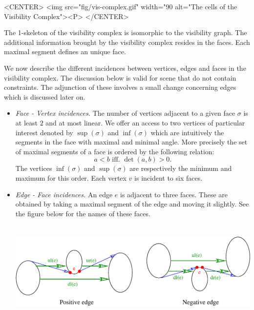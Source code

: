 \begin{ccHtmlOnly}
    <CENTER>
        <img src="fig/vis-complex.gif" width="90%
         alt="The cells of the Visibility Complex"><P>
    </CENTER>
\end{ccHtmlOnly}

The 1-skeleton of the visibility complex is isomorphic to the visibility graph.
The additional information brought by the visibility complex resides in the
faces. Each maximal segment defines an unique face.

We now describe the different incidences between vertices, edges and faces in
the visibility complex. The discussion below is valid for scene that do not
contain constraints. The adjunction of these involves a small change concerning
edges which is discussed later on.
\begin{itemize}
    \item \emph{Face - Vertex incidences. } The number of vertices adjacent to a
    given face $\sigma$ is at least $2$ and at most linear. We offer an access
    to two vertices of particular interest denoted by $\sup(\sigma)$ and 
    $\inf(\sigma)$ which are intuitively the segments in the face with maximal 
    and minimal angle. More precisely the set of maximal segments of a face is
    ordered by the following relation:
    \begin{equation}
                    a < b \textrm{ iff. } \det(a,b) > 0.
    \end{equation}
    The vertices $\inf(\sigma)$ and $\sup(\sigma)$ are respectively the minimum
    and maximum for this order. 
    Each vertex $v$ is incident to six faces. 
    \item \emph{Edge - Face incidences. } An edge $e$ is adjacent to three
    faces. These are obtained by taking a maximal segment of the edge and moving
    it slightly. See the figure below for the names of these faces.

    \begin{ccTexOnly}
        \begin{center}
            \includegraphics[height=5cm,width=\linewidth]{fig/edge-face.eps}%
        \end{center}
    \end{ccTexOnly}


\end{itemize}
